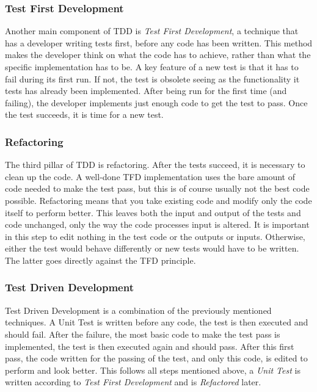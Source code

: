 \documentclass[11pt,british]{article}
\begin{document}
\subsubsection{Test First Development}
Another main component of TDD is \emph{Test First Development}, a technique that has a developer writing tests first, before any code has been written. This method makes the developer think on what the code has to achieve, rather than what the specific implementation has to be. A key feature of a new test is that it has to fail during its first run. If not, the test is obsolete seeing as the functionality it tests has already been implemented. After being run for the first time (and failing), the developer implements just enough code to get the test to pass. Once the test succeeds, it is time for a new test.

\subsubsection{Refactoring}
The third pillar of TDD is refactoring. After the tests succeed, it is necessary to clean up the code. A well-done TFD implementation uses the bare amount of code needed to make the test pass, but this is of course usually not the best code possible. Refactoring means that you take existing code and modify only the code itself to perform better. This leaves both the input and output of the tests and code unchanged, only the way the code processes input is altered. It is important in this step to edit nothing in the test code or the outputs or inputs. Otherwise, either the test would behave differently or new tests would have to be written. The latter goes directly against the TFD principle.

\subsubsection{Test Driven Development}
Test Driven Development is a combination of the previously mentioned techniques. A Unit Test is written before any code, the test is then executed and should fail. After the failure, the most basic code to make the test pass is implemented, the test is then executed again and should pass. After this first pass, the code written for the passing of the test, and only this code, is edited to perform and look better. This follows all steps mentioned above, a \emph{Unit Test} is written according to \emph{Test First Development} and is \emph{Refactored} later.

\newpage
\end{document}
